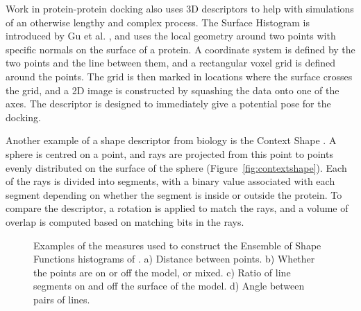 \documentclass[11pt,a4paper]{kth-mag}
\begin{document}
Work in protein-protein docking also uses 3D descriptors to help with
simulations of an otherwise lengthy and complex process. The Surface Histogram
is introduced by Gu et al. \cite{gu2012surface}, and uses the local geometry
around two points with specific normals on the surface of a protein. A
coordinate system is defined by the two points and the line between them, and a
rectangular voxel grid is defined around the points. The grid is then marked in
locations where the surface crosses the grid, and a 2D image is constructed by
squashing the data onto one of the axes. The descriptor is designed to
immediately give a potential pose for the docking.

Another example of a shape descriptor from biology is the Context Shape
\cite{shentu2008context}. A sphere is centred on a point, and rays are projected
from this point to points evenly distributed on the surface of the sphere (Figure~\ref{fig:contextshape}). Each
of the rays is divided into segments, with a binary value associated with each
segment depending on whether the segment is inside or outside the protein. To
compare the descriptor, a rotation is applied to match the rays, and a volume of
overlap is computed based on matching bits in the rays.

\begin{figure}
  \centering
  \caption{Examples of the measures used to construct the Ensemble of Shape
    Functions histograms of \cite{wohlkinger2011ensemble}. a) Distance between
    points. b) Whether the points are on or off the model, or mixed. c) Ratio of
    line segments on and off the surface of the model. d) Angle between pairs of lines.}
  \label{fig:wohlESF}
\end{figure}
\end{document}
